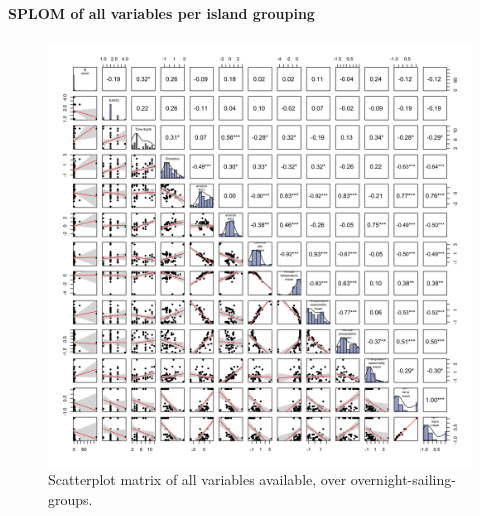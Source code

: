 \documentclass[unnumsec,webpdf,modern,medium]{oup-authoring-template}
\begin{document}
\FloatBarrier
\paragraph{SPLOM of all variables per island grouping}
\label{appendix_supp_figs_SPLOM_all_vars}





\begin{figure}[ht]
\centering
\includegraphics[width=\textwidth]{SPLOM_SBZR_all_variables.png}
\caption{Scatterplot matrix of all variables available, over overnight-sailing-groups.}
\label{appendix_SPLOM_SBZR_all_variables}
\end{figure}
\end{document}
